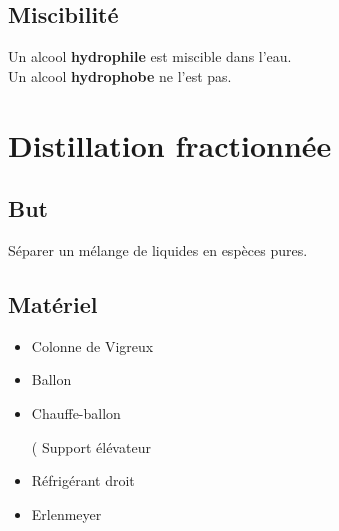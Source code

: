 \documentclass{article}
\begin{document}
\subsection{Miscibilité}
Un alcool \textbf{hydrophile} est miscible dans l'eau. \\ Un alcool \textbf{hydrophobe} ne l'est pas.
\newpage
\section{Distillation fractionnée}
\subsection{But}
Séparer un mélange de liquides en espèces pures.
\subsection{Matériel}
\begin{itemize}
	\item Colonne de Vigreux
	\item Ballon
	\item Chauffe-ballon
	\item[(] Support élévateur
	\item Réfrigérant droit
	\item Erlenmeyer
\end{itemize}
\end{document}

